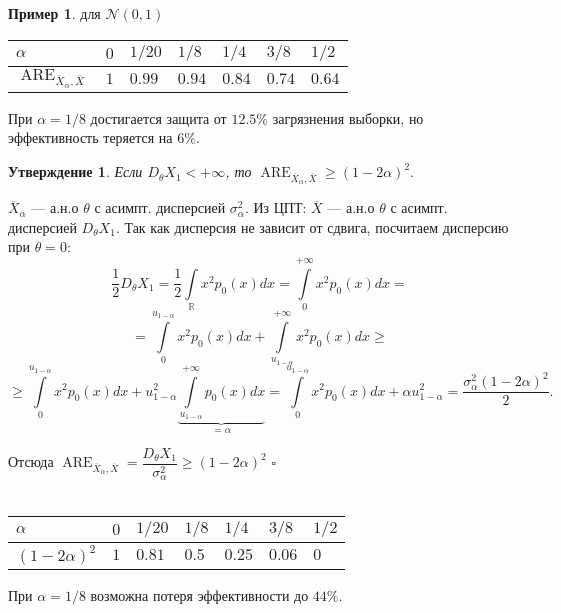 \documentclass[12pt]{report}
\renewenvironment{proof}{{\bfseries Доказательство:}}{$\square$\\\\}
\newtheorem{proposition}{Утверждение}
\theoremstyle{definition}
\newtheorem{example}{Пример}
\begin{document}
\begin{example}
	для $\mathcal{N}(0, 1)$
	\begin{table}[]
		\begin{tabular}{|l|l|l|l|l|l|l|}
		\hline
		$\alpha$   													& $0$ & $1/20$ & $1/8$ & $1/4$ & $3/8$ & $1/2$ \\ \hline
		$\operatorname{ARE}_{\overline{X}_\alpha, \overline{X}}$  	& $1$ & $0.99$ & $0.94$ & $0.84$ & $0.74$ & $0.64$ \\ \hline
		\end{tabular}
	\end{table}

При $\alpha = 1/8$ достигается защита от $12.5 \%$ загрязнения выборки, но эффективность теряется на $6 \%$.
\end{example}
\begin{proposition}
	Если $D_\theta X_1 < +\infty$, то $\operatorname{ARE}_{\overline{X}_\alpha, \overline{X}} \geqslant (1-2\alpha)^2.$  
\end{proposition}
\begin{proof}
	$\overline{X}_\alpha$  — а.н.о $\theta$ с асимпт. дисперсией $\sigma_\alpha^2$.  
Из ЦПТ: $\overline{X}$ — а.н.о $\theta$ с асимпт. дисперсией $D_\theta X_1$. Так как дисперсия не зависит от сдвига, посчитаем дисперсию при $\theta = 0$:
$$ \dfrac{1}{2}D_\theta X_1 = \dfrac{1}{2} \int\limits_{\mathbb{R}} x^2p_0(x)dx = \int\limits_0^{+\infty}x^2p_0(x)dx =$$
$$= \int\limits_0^{u_{1-\alpha}}x^2p_0(x)dx + \int\limits_{u_{1-\alpha}}^{+\infty}x^2p_0(x)dx \geqslant$$
$$\geqslant \int\limits_0^{u_{1-\alpha}}x^2p_0(x)dx + u_{1-\alpha}^2\underbrace{\int\limits_{u_{1-\alpha}}^{+\infty}p_0(x)dx}_{=\alpha} = \int\limits_0^{u_{1-\alpha}}x^2p_0(x)dx + \alpha u^2_{1 - \alpha}
= \dfrac{\sigma^2_\alpha (1 - 2\alpha)^2}{2}. $$

Отсюда $\operatorname{ARE}_{\overline{X}_\alpha, \overline{X}} = \dfrac{D_\theta X_1}{\sigma^2_\alpha} \geqslant (1 - 2\alpha)^2$
\end{proof}
\begin{table}[]
	\begin{tabular}{|l|l|l|l|l|l|l|}
	\hline
	$\alpha$   			& $0$ & $1/20$ & $1/8$ & $1/4$ & $3/8$ & $1/2$ \\ \hline
	$(1 - 2\alpha)^2$	& $1$ & $0.81$ & $0.5$ & $0.25$ & $0.06$ & $0$ \\ \hline
	\end{tabular}
\end{table}

При $\alpha = 1/8$ возможна потеря эффективности до $44 \%$.
\end{document}
